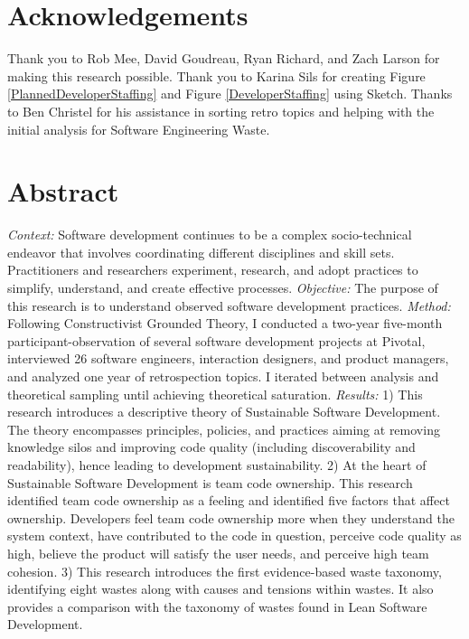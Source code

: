 \documentclass[oneside,letterpaper]{memoir}
\begin{document}
\frontmatter

\thetitlepage
\copyrightpage

\section*{Acknowledgements}
Thank you to Rob Mee, David Goudreau, Ryan Richard, and Zach Larson for making this research possible. Thank you to Karina Sils for creating Figure \ref{PlannedDeveloperStaffing} and Figure \ref{DeveloperStaffing} using Sketch. Thanks to Ben Christel for his assistance in sorting retro topics and helping with the initial analysis for Software Engineering Waste.

\newpage
\section*{Abstract}
\textit{Context:} Software development continues to be a complex socio-technical endeavor that involves coordinating different disciplines and skill sets. Practitioners and researchers experiment, research, and adopt practices to simplify, understand, and create effective processes. 
\textit{Objective:} The purpose of this research is to understand observed software development practices.
\textit{Method:} Following Constructivist Grounded Theory, I conducted a two-year five-month participant-observation of several software development projects at Pivotal, interviewed 26 software engineers, interaction designers, and product managers, and analyzed one year of retrospection topics. I iterated between analysis and theoretical sampling until achieving theoretical saturation.
\textit{Results:} 1) This research introduces a descriptive theory of Sustainable Software Development. The theory encompasses principles, policies, and practices aiming at removing knowledge silos and improving code quality (including discoverability and readability), hence leading to development sustainability. 2) At the heart of Sustainable Software Development is team code ownership. This research identified team code ownership as a feeling and identified five factors that affect ownership. Developers feel team code ownership more when they understand the system context, have contributed to the code in question, perceive code quality as high, believe the product will satisfy the user needs, and perceive high team cohesion. 3) This research introduces the first evidence-based waste taxonomy, identifying eight wastes along with causes and tensions within wastes. It also provides a comparison with the taxonomy of wastes found in Lean Software Development.  
\end{document}
